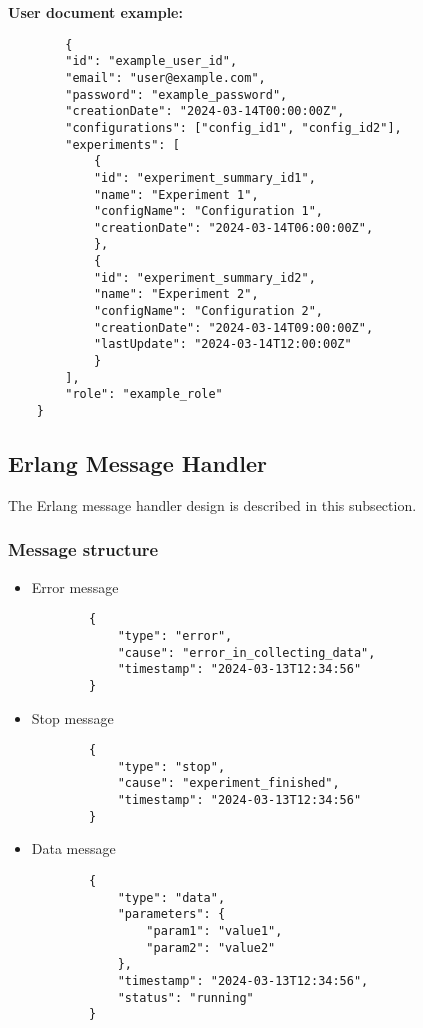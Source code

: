 \newpage
\textbf{User document example:} \begin{verbatim}
        {
        "id": "example_user_id",
        "email": "user@example.com",
        "password": "example_password",
        "creationDate": "2024-03-14T00:00:00Z",
        "configurations": ["config_id1", "config_id2"],
        "experiments": [
            {
            "id": "experiment_summary_id1",
            "name": "Experiment 1",
            "configName": "Configuration 1",
            "creationDate": "2024-03-14T06:00:00Z",
            },
            {
            "id": "experiment_summary_id2",
            "name": "Experiment 2",
            "configName": "Configuration 2",
            "creationDate": "2024-03-14T09:00:00Z",
            "lastUpdate": "2024-03-14T12:00:00Z"
            }
        ],
        "role": "example_role"
    }

    \end{verbatim}
\newpage
\subsection{Erlang Message Handler}

The Erlang message handler design is described in this subsection.

\subsubsection{Message structure}
\begin{itemize}
    \item Error message \begin{verbatim}
        {
            "type": "error",
            "cause": "error_in_collecting_data",
            "timestamp": "2024-03-13T12:34:56"
        }
    \end{verbatim}
    \item Stop message \begin{verbatim}
        {
            "type": "stop",
            "cause": "experiment_finished",
            "timestamp": "2024-03-13T12:34:56"
        }
    \end{verbatim}
    \item Data message \begin{verbatim}
        {   
            "type": "data",
            "parameters": {
                "param1": "value1",
                "param2": "value2"
            },
            "timestamp": "2024-03-13T12:34:56",
            "status": "running"
        }
    \end{verbatim}
\end{itemize}

